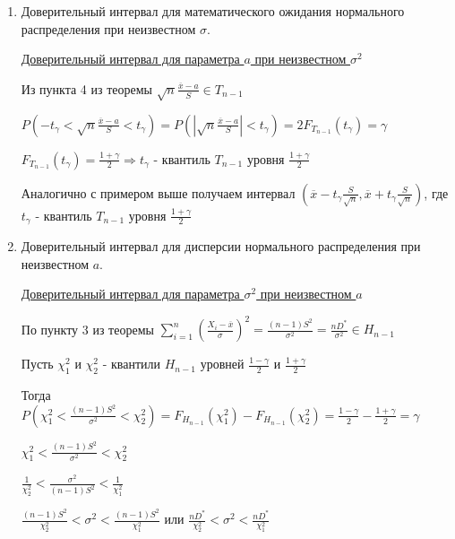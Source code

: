 \documentclass[12pt]{article}
\begin{document}
\begin{enumerate}
    Доверительный интервал надежности $\gamma$: $\left(\overline{x} - t_\gamma \frac{\sigma}{\sqrt{n}}, 
    \overline{x} + t_\gamma \frac{\sigma}{\sqrt{n}}\right)$, 
    где $t_\gamma$ - квантиль $N(0, 1)$ уровня $\frac{1 + \gamma}{2}$

    \item Доверительный интервал для математического ожидания нормального распределения при неизвестном $\sigma$.

    \hyperlink{confidence_interval_for_a_unknown_sigma}{Доверительный интервал для параметра $a$ при неизвестном $\sigma^2$}

    Из пункта 4 из теоремы $\sqrt{n} \frac{\overline{x} - a}{S} \in T_{n - 1}$

    $P\left(-t_\gamma < \sqrt{n} \frac{\overline{x} - a}{S} < t_\gamma\right) = P\left(\left|\sqrt{n} \frac{\overline{x} - a}{S}\right| < t_\gamma\right) = 2F_{T_{n - 1}}(t_\gamma) = \gamma$

    $F_{T_{n - 1}}(t_\gamma) = \frac{1 + \gamma}{2} \Longrightarrow t_\gamma$ - квантиль $T_{n - 1}$ уровня 
    $\frac{1 + \gamma}{2}$

    Аналогично с примером выше получаем интервал $\left(\overline{x} - t_\gamma \frac{S}{\sqrt{n}}, 
    \overline{x} + t_\gamma \frac{S}{\sqrt{n}}\right)$, 
    где $t_\gamma$ - квантиль $T_{n - 1}$ уровня $\frac{1 + \gamma}{2}$

    \item Доверительный интервал для дисперсии нормального распределения при неизвестном $a$.

    \hyperlink{confidence_interval_for_sigma_unknown_a}{Доверительный интервал для параметра $\sigma^2$ при неизвестном $a$}

    По пункту 3 из теоремы $\sum_{i = 1}^n \left(\frac{X_i - \overline{x}}{\sigma}\right)^2 = \frac{(n - 1)S^2}{\sigma^2} = 
    \frac{nD^*}{\sigma^2} \in H_{n - 1}$

    Пусть $\chi_1^2$ и $\chi_2^2$ - квантили $H_{n - 1}$ уровней $\frac{1 - \gamma}{2}$ и $\frac{1 + \gamma}{2}$

    Тогда $P\left(\chi_1^2 < \frac{(n - 1)S^2}{\sigma^2} < \chi_2^2\right) = F_{H_{n - 1}}(\chi_1^2) - F_{H_{n - 1}}(\chi_2^2) = \frac{1 - \gamma}{2} - \frac{1 + \gamma}{2} = \gamma$

    $\chi_1^2 < \frac{(n - 1)S^2}{\sigma^2} < \chi_2^2$

    $\frac{1}{\chi_2^2} < \frac{\sigma^2}{(n - 1)S^2} < \frac{1}{\chi_1^2}$

    $\frac{(n - 1)S^2}{\chi_2^2} < \sigma^2 < \frac{(n - 1)S^2}{\chi_1^2}$ или 
    $\frac{nD^*}{\chi_2^2} < \sigma^2 < \frac{nD^*}{\chi_1^2}$


\end{enumerate}
\end{document}
